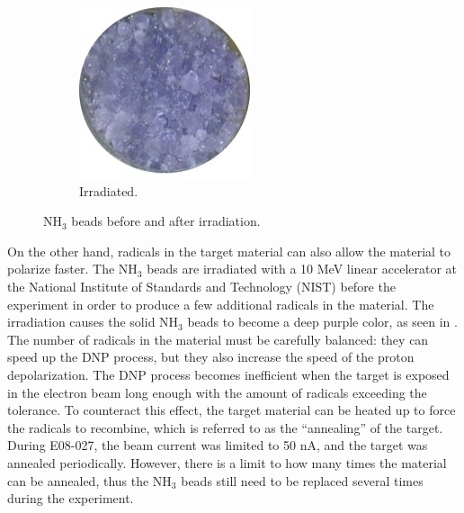 \begin{figure}[tb!]
\begin{subfigure}[t]{0.2\textwidth}
    \includegraphics[width=\textwidth]{figs/ammonia-irradiated.jpg}
    \caption{Irradiated. \label{C5S3SS2F3b}}
  \end{subfigure}
  \caption[NH${}_3$ beads before and after irradiation.]{NH${}_3$ beads before and after irradiation. \label{C5S3SS2F3}}
\end{figure}

On the other hand, radicals in the target material can also allow the material to polarize faster. The NH${}_3$ beads are irradiated with a 10 MeV linear accelerator at the National Institute of Standards and Technology (NIST) before the experiment in order to produce a few additional radicals in the material. The irradiation causes the solid NH${}_3$ beads to become a deep purple color, as seen in . The number of radicals in the material must be carefully balanced: they can speed up the DNP process, but they also increase the speed of the proton depolarization. The DNP process becomes inefficient when the target is exposed in the electron beam long enough with the amount of radicals exceeding the tolerance. To counteract this effect, the target material can be heated up to force the radicals to recombine, which is referred to as the ``annealing'' of the target. During E08-027, the beam current was limited to 50 nA, and the target was annealed periodically. However, there is a limit to how many times the material can be annealed, thus the NH${}_3$ beads still need to be replaced several times during the experiment.

